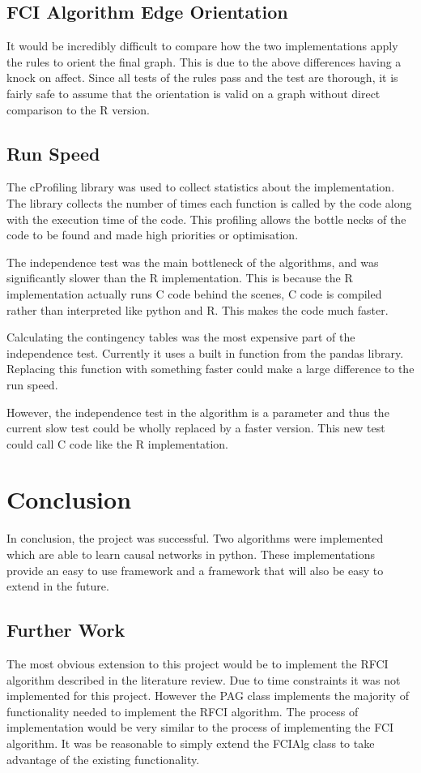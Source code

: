 \documentclass{UoYCSproject}
\begin{document}
\section{FCI Algorithm Edge Orientation}

It would be incredibly difficult to compare how the two implementations apply the rules to orient the final graph. This is due to the above differences having a knock on affect. Since all tests of the rules pass and the test are thorough, it is fairly safe to assume that the orientation is valid on a graph without direct comparison to the R version.

\section{Run Speed}
The cProfiling library was used to collect statistics about the implementation. The library collects the number of times each function is called by the code along with the execution time of the code. This profiling allows the bottle necks of the code to be found and made high priorities or optimisation.

The independence test was the main bottleneck of the algorithms, and was significantly slower than the R implementation. This is because the R implementation actually runs C code behind the scenes, C code is compiled rather than interpreted like python and R. This makes the code much faster.

Calculating the contingency tables was the most expensive part of the independence test. Currently it uses a built in function from the pandas library. Replacing this function with something faster could make a large difference to the run speed.

However, the independence test in the algorithm is a parameter and thus the current slow test could be wholly replaced by a faster version. This new test could call C code like the R implementation.

\chapter{Conclusion}
In conclusion, the project was successful. Two algorithms were implemented which are able to learn causal networks in python. These implementations provide an easy to use framework and a framework that will also be easy to extend in the future.

\section{Further Work}
The most obvious extension to this project would be to implement the RFCI algorithm described in the literature review. Due to time constraints it was not implemented for this project. However the PAG class implements the majority of functionality needed to implement the RFCI algorithm. The process of implementation would be very similar to the process of implementing the FCI algorithm. It was be reasonable to simply extend the FCIAlg class to take advantage of the existing functionality.
\end{document}
